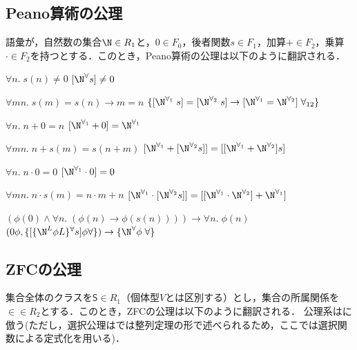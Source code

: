 \documentclass[../../main-detail.tex]{subfiles}
\begin{document}
\subsection{Peano算術の公理}
語彙が，自然数の集合$\N \in R_1$と，$0 \in F_0$，後者関数$s \in F_1$，加算$+ \in F_2$，乗算$\cdot \in F_2$を持つとする．このとき，Peano算術の公理は以下のように翻訳される．
\begin{exe}
    \ex \begin{xlist}
        \ex $\forall n.\; s(n) \neq 0$
        \ex $[\N^\forall s] \neq 0$
    \end{xlist}
    \ex \begin{xlist}
        \ex $\forall m n.\; s(m) = s(n) \to m = n$
        \ex $\{[\N^{\forall_1}\; s] = [\N^{\forall_2}\; s] \to [\N^{\forall_1} = \N^{\forall_2}]\; \forall_{12}\}$
    \end{xlist}
    \ex \begin{xlist}
        \ex $\forall n.\; n + 0 = n$
        \ex $[\N^{\forall_1} + 0] = \N^{\forall_1}$
    \end{xlist}
    \ex \begin{xlist}
        \ex $\forall m n.\; n + s(m) = s(n + m)$
        \ex $[\N^{\forall_1} + [\N^{\forall_2}s]] =[[\N^{\forall_1} + \N^{\forall_2}] s]$
    \end{xlist}
    \ex \begin{xlist}
        \ex $\forall n.\; n \cdot 0 = 0$
        \ex $[\N^{\forall_1} \cdot 0] = 0$
    \end{xlist}
    \ex \begin{xlist}
        \ex $\forall m n.\; n \cdot s(m) = n \cdot m + n$
        \ex $[\N^{\forall_1} \cdot [\N^{\forall_2}s]] = [[\N^{\forall_1} \cdot \N^{\forall_2}] + \N^{\forall_1}]$
    \end{xlist}
    \ex \begin{xlist}
        \ex $(\phi(0) \land \forall n.\; (\phi(n) \to \phi(s(n)))) \to \forall n.\; \phi(n)$
        \ex $(0\phi,\{[\{\N^L \phi L\}^\forall s]\phi\forall\}) \to \{\N^\forall \phi \; \forall\}$
    \end{xlist}
\end{exe}
\subsection{ZFCの公理}
集合全体のクラスを$\mathsf S \in R_1$（個体型$V$とは区別する）とし，集合の所属関係を${\in} \in R_2$とする．このとき，ZFCの公理は以下のように翻訳される．%
公理系は\cite{kunen}に倣う(ただし，選択公理は\cite{kunen}では整列定理の形で述べられるため，ここでは選択関数による定式化を用いる)．
\end{document}
